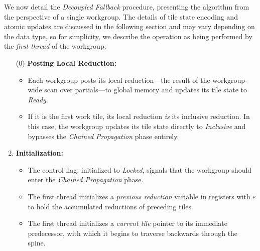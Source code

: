 \documentclass[sigconf,screen]{acmart}
\begin{document}
We now detail the \emph{Decoupled Fallback} procedure, presenting the algorithm from the perspective of a single workgroup. The details of tile state encoding and atomic updates are discussed in the following section and may vary depending on the data type, so for simplicity, we describe the operation as being performed by the \emph{first thread} of the workgroup:
\begin{enumerate}
  \item[(0)] \textbf{Posting Local Reduction:}
        \begin{itemize}
          \item Each workgroup posts its local reduction---the result of the workgroup-wide scan over partials---to global memory and updates its tile state to \emph{Ready}.
          \item If it is the first work tile, its local reduction \emph{is} its inclusive reduction. In this case, the workgroup updates its tile state directly to \emph{Inclusive} and bypasses the \emph{Chained Propagation} phase entirely.
        \end{itemize}

  \item \textbf{Initialization:}
        \begin{itemize}
          \item The control flag, initialized to \emph{Locked}, signals that the workgroup should enter the \emph{Chained Propagation} phase.
          \item The first thread initializes a \emph{previous reduction} variable in registers with $\varepsilon$ to hold the accumulated reductions of preceding tiles.
          \item The first thread initializes a \emph{current tile} pointer to its immediate predecessor, with which it begins to traverse backwards through the spine.
        \end{itemize}


\end{enumerate}
\end{document}
